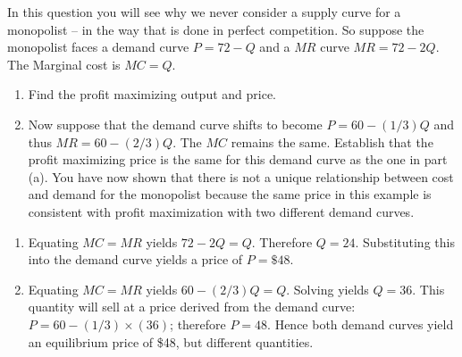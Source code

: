 \begin{enumialphparenastyle}
\begin{ex}\label{ex:ch10ex3}
In this question you will see why we never consider a supply curve for a monopolist -- in the way that is done in perfect competition. So suppose the monopolist faces a demand curve $P=72-Q$ and a $MR$ curve $MR=72-2Q$. The Marginal cost is $MC=Q$.
\begin{enumerate}
	\item	Find the profit maximizing output and price. 
	\item	Now suppose that the demand curve shifts to become $P=60-(1/3)Q$ and thus $MR=60-(2/3)Q$. The $MC$ remains the same. Establish that the profit maximizing price is the same for this demand curve as the one in part (a). You have now shown that there is not a unique relationship between cost and demand for the monopolist because the same price in this example is consistent with profit maximization with two different demand curves.
\end{enumerate}
\begin{sol}
\begin{enumerate}
	\item	Equating $MC=MR$ yields $72-2Q=Q$. Therefore $Q=24$. Substituting this into the demand curve yields a price of $P=\$48$.
	\item	Equating $MC=MR$ yields $60-(2/3)Q=Q$. Solving yields $Q=36$. This quantity will sell at a price derived from the demand curve: $P=60-(1/3)\times(36)$; therefore $P=48$. Hence both demand curves yield an equilibrium price of \$48, but different quantities.
\end{enumerate}
\end{sol}
\end{ex}


\end{enumialphparenastyle}
